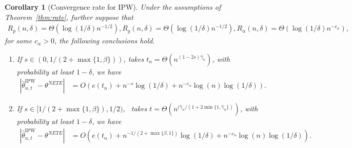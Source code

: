 \documentclass[12pt]{article}
\theoremstyle{plain}
\newtheorem{corollary}[theorem]{Corollary}
\theoremstyle{definition}
\begin{document}
\begin{corollary}[Convergence rate for IPW]
  \label{cor:rate_ipw}Under the assumptions of Theorem~\ref{thm:rate}, further
  suppose that
  \begin{align*}
    R_p (n, \delta) = \Theta (\log (1 / \delta) n^{- 1 / 2}) , R_g (n, \delta) = \Theta (\log (1 / \delta) n^{- 1 / 2}), R_\alpha (n, \delta) = \Theta( \log(1/\delta) n^{-c_\alpha}),
  \end{align*}
  for some $c_\alpha > 0 $, the following conclusions hold.
  \begin{enumerate}
    \item If $s \in (0, 1 / (2 + \max \{1, \beta\}))$, takes $t_n = \Theta (n^{
    (1 - 2 s) \hat{\gamma}_{n}})$, with probability at least $1 - \delta$,
    we have
    \begin{align*}
      | {{\widehat{\theta }_{n, t}^{\text{IPW} }} }   - \theta^{NETE} | & = O
      (e (t_n) + n^{- s} \log (1 / \delta) +  n^{-c_\alpha} \log(n)\log (1 / \delta)) .
    \end{align*}
    \item If $s \in [1 / (2 + \max \{1, \beta\}), 1 / 2)$, \ takes $t = \Theta
    (n^{(\hat{\gamma}_{n} / (1 + 2 \min \{1, \hat{\gamma}_{n} \})})$,
    with probability at least $1 - \delta$, we have
    \begin{align*}
      | {{\widehat{\theta }_{n, t}^{\text{IPW} }} }   - \theta^{NETE} | & = O
      (e (t_n) + n^{- 1 / (2 + \max \{\beta, 1\})} \log (1 / \delta) +  n^{-c_\alpha} \log(n)\log (1 / \delta)) .
    \end{align*}
  \end{enumerate}
\end{corollary}
\end{document}

